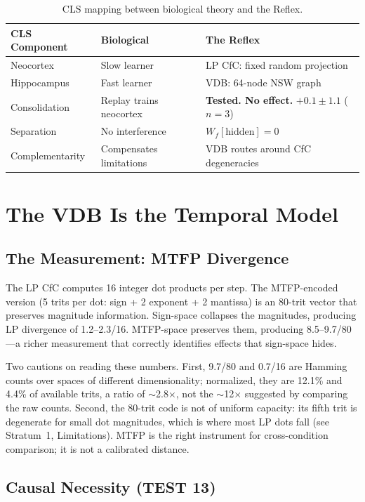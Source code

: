 \documentclass[11pt,letterpaper]{article}
\begin{document}
\begin{table}[h]
\centering
\begin{tabular}{lll}
\toprule
CLS Component & Biological & The Reflex \\
\midrule
Neocortex & Slow learner & LP CfC: fixed random projection \\
Hippocampus & Fast learner & VDB: 64-node NSW graph \\
Consolidation & Replay trains neocortex & \textbf{Tested. No effect.} $+0.1 \pm 1.1$ ($n=3$) \\
Separation & No interference & $W_f[\text{hidden}] = 0$ \\
Complementarity & Compensates limitations & VDB routes around CfC degeneracies \\
\bottomrule
\end{tabular}
\caption{CLS mapping between biological theory and the Reflex.}
\end{table}

\section{The VDB Is the Temporal Model}

\subsection{The Measurement: MTFP Divergence}

The LP CfC computes 16 integer dot products per step. The MTFP-encoded version (5 trits per dot: sign + 2 exponent + 2 mantissa) is an 80-trit vector that preserves magnitude information. Sign-space collapses the magnitudes, producing LP divergence of 1.2--2.3/16. MTFP-space preserves them, producing 8.5--9.7/80---a richer measurement that correctly identifies effects that sign-space hides.

Two cautions on reading these numbers. First, 9.7/80 and 0.7/16 are Hamming counts over spaces of different dimensionality; normalized, they are 12.1\% and 4.4\% of available trits, a ratio of $\sim$2.8$\times$, not the $\sim$12$\times$ suggested by comparing the raw counts. Second, the 80-trit code is not of uniform capacity: its fifth trit is degenerate for small dot magnitudes, which is where most LP dots fall (see Stratum~1, Limitations). MTFP is the right instrument for cross-condition comparison; it is not a calibrated distance.

\subsection{Causal Necessity (TEST 13)}
\end{document}
